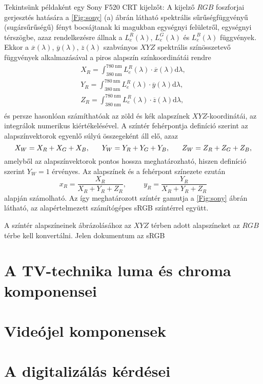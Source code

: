 Tekintsünk példaként egy Sony F520 CRT kijelzőt: 
A kijelző $RGB$ foszforjai gerjesztés hatására a \ref{Fig:sony} (a) ábrán látható spektrális sűrűségfüggvényű (sugársűrűségű) fényt bocsájtanak ki magukban egységnyi felületről, egységnyi térszögbe, azaz rendelkezésre állnak a $L_{e}^R(\lambda)$, $L_{e}^G(\lambda)$ és $L_{e}^B(\lambda)$ függvények.
Ekkor a $\overline{x}(\lambda)$, $\overline{y}(\lambda)$, $\overline{z}(\lambda)$ szabványos $XYZ$ spektrális színösszetevő függvények alkalmazásával a piros alapszín színkoordinátái rendre
\begin{eqnarray}
X_R = \int_{380~\mathrm{nm}}^{780~\mathrm{nm}} L_{e}^R(\lambda) \cdot \overline{x}(\lambda) \mathrm{d} \lambda, \\
Y_R = \int_{380~\mathrm{nm}}^{780~\mathrm{nm}} L_{e}^R(\lambda) \cdot \overline{y}(\lambda) \mathrm{d} \lambda, \\
Z_R = \int_{380~\mathrm{nm}}^{780~\mathrm{nm}} L_{e}^R(\lambda) \cdot \overline{z}(\lambda) \mathrm{d} \lambda, \\
\end{eqnarray}
és persze hasonlóan számíthatóak az zöld és kék alapszínek $XYZ$-koordinátái, az integrálok numerikus kiértékelésével.
A színtér fehérpontja definíció szerint az alapszínvektorok egyenlő súlyú összegeként áll elő, azaz
\begin{equation}
X_W = X_R + X_G + X_B, \hspace{6mm} Y_W = Y_R + Y_G + Y_B, \hspace{6mm} Z_W = Z_R + Z_G+ Z_B,
\end{equation}
amelyből az alapszínvektorok pontos hossza meghatározható, hiszen definíció szerint $Y_W = 1$ érvényes.
Az alapszínek és a fehérpont színezete ezután
\begin{equation}
x_R = \frac{X_R}{X_R + Y_R + Z_R}, \hspace{1cm} y_R = \frac{Y_R}{X_R + Y_R + Z_R}
\end{equation}
alapján számolható.
Az így meghatározott színtér gamutja a \ref{Fig:sony} ábrán látható, az alapértelmezett számítógépes sRGB színtérrel együtt.

A színtér alapszíneinek ábrázolásához az $XYZ$ térben adott alapszíneket az $RGB$ térbe kell konvertálni.
Jelen dokumentum az sRGB 

\section{A TV-technika luma és chroma komponensei}

\section{Videójel komponensek}

\section{A digitalizálás kérdései}